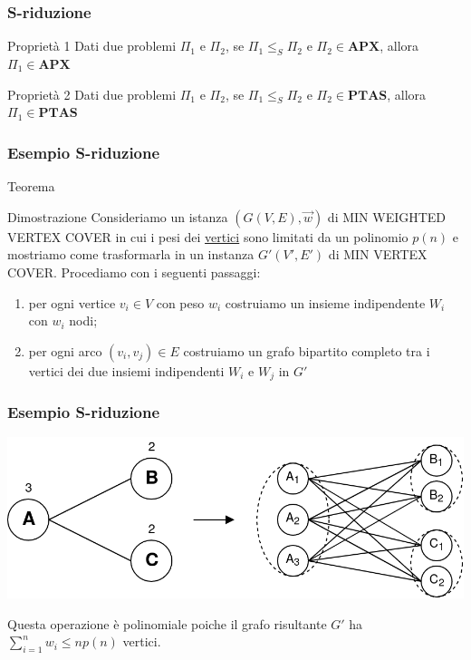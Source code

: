 \documentclass{beamer}
\begin{document}
\begin{frame}
    \frametitle{S-riduzione}
    \begin{block}{Proprietà 1}
        Dati due problemi $\Pi_1$ e $\Pi_2$, se $\Pi_1 \leq_S \Pi_2$ e $\Pi_2 \in \textbf{APX}$, allora $\Pi_1 \in \textbf{APX}$ 
    \end{block}
    \begin{block}{Proprietà 2}
        Dati due problemi $\Pi_1$ e $\Pi_2$, se $\Pi_1 \leq_S \Pi_2$ e $\Pi_2 \in \textbf{PTAS}$, allora $\Pi_1 \in \textbf{PTAS}$ 
    \end{block}


\end{frame}

\begin{frame}
    \frametitle{Esempio S-riduzione}
    \begin{block}{Teorema}
        \begin{center}
        \end{center}
    \end{block}
    \begin{block}{Dimostrazione}
        Consideriamo un istanza $(G(V, E), \vec{w})$ di MIN WEIGHTED VERTEX COVER  in cui i pesi dei \underline{vertici} sono limitati da un polinomio $p(n)$   
        e mostriamo come trasformarla in un instanza $G'(V', E')$ di MIN VERTEX COVER. Procediamo con i seguenti passaggi:
        \begin{enumerate}
         \item per ogni vertice $v_i\in V$ con peso $w_i$ costruiamo un insieme indipendente $W_i$ con $w_i$ nodi;
         \item per ogni arco $(v_i, v_j) \in E $ costruiamo un grafo bipartito completo tra i vertici dei due insiemi indipendenti $W_i$ e $W_j$ in $G'$
        \end{enumerate}

    \end{block}
\end{frame}

\begin{frame}
    \frametitle{Esempio S-riduzione}
        \begin{center}
            \includegraphics[width=\textwidth]{../images/GtoG'.png}
        \end{center}
        Questa operazione è polinomiale poiche il grafo risultante $G'$ ha $\sum_{i=1}^{n}w_i \leq np(n)$ vertici.
        
\end{frame}
\end{document}
